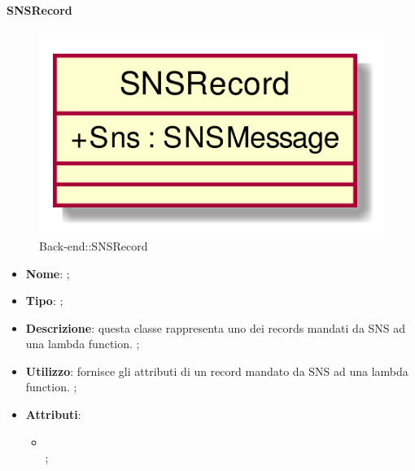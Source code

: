\hypertarget{SNSRecord_label}{\paragraph{SNSRecord}}
\begin{figure}[h]
	\centering
	\includegraphics[width=\textwidth,height=\textheight,keepaspectratio]{images/ClassSNSRecord.png}
	\caption{Back-end::SNSRecord}
\end{figure}
\begin{itemize}
	\item \textbf{Nome}: ;
	\item \textbf{Tipo}: ;
	\item \textbf{Descrizione}: questa classe rappresenta uno dei records mandati da SNS ad una lambda function. ;
	\item \textbf{Utilizzo}: fornisce gli attributi di un record mandato da SNS ad una lambda function. ;
	\item \textbf{Attributi}:
	\begin{itemize}
		\item[]  \\
		;
	\end{itemize}
\end{itemize}
\FloatBarrier


